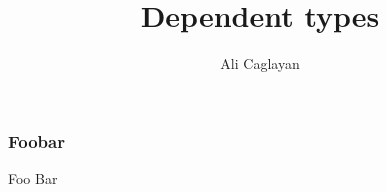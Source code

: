 \documentclass{beamer}
\title{Dependent types}
\author{Ali Caglayan}
\institute{University of Bath}
\begin{document}
    \frame{\titlepage}
    
    \begin{frame}
        \frametitle{Foobar}
        Foo \pause
        Bar
    \end{frame}
\end{document}
